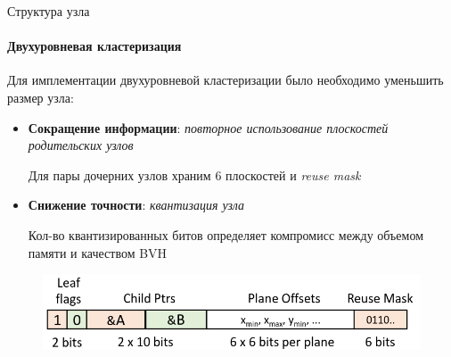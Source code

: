 \begin{frame}[t]{Структура узла}
    \framesubtitle{Двухуровневая кластеризация}
    Для имплементации двухуровневой кластеризации было необходимо уменьшить размер узла:
    \begin{itemize}
        \item
            \textbf{Сокращение информации}: \textit{повторное использование плоскостей родительских узлов}

            Для пары дочерних узлов храним 6 плоскостей и \textit{reuse mask}
        \item
            \textbf{Снижение точности}: \textit{квантизация узла}

            Кол-во квантизированных битов определяет компромисс между объемом памяти и качеством BVH

    \end{itemize}

    \begin{figure}
        \begin{center}
            \includegraphics[keepaspectratio, width=\textwidth]{res/8byte_node.png}
        \end{center}
    \end{figure}
\end{frame}

